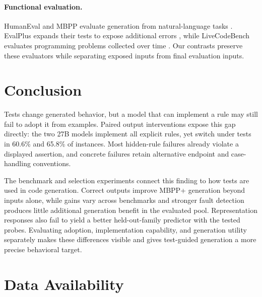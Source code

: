 \documentclass[acmsmall,screen,review,anonymous]{acmart}
\begin{document}
\paragraph{Functional evaluation.}
HumanEval and MBPP evaluate generation from natural-language tasks \citep{chen2021codex,austin2021mbpp}.
EvalPlus expands their tests to expose additional errors \citep{liu2023evalplus}, while LiveCodeBench evaluates programming problems collected over time \citep{jain2024livecodebench}.
Our contrasts preserve these evaluators while separating exposed inputs from final evaluation inputs.

\section{Conclusion}

Tests change generated behavior, but a model that can implement a rule may still fail to adopt it from examples.
Paired output interventions expose this gap directly: the two 27B models implement all explicit rules, yet switch under tests in 60.6\% and 65.8\% of instances.
Most hidden-rule failures already violate a displayed assertion, and concrete failures retain alternative endpoint and case-handling conventions.

The benchmark and selection experiments connect this finding to how tests are used in code generation.
Correct outputs improve MBPP+ generation beyond inputs alone, while gains vary across benchmarks and stronger fault detection produces little additional generation benefit in the evaluated pool.
Representation responses also fail to yield a better held-out-family predictor with the tested probes.
Evaluating adoption, implementation capability, and generation utility separately makes these differences visible and gives test-guided generation a more precise behavioral target.

\section*{Data Availability}




\end{document}
